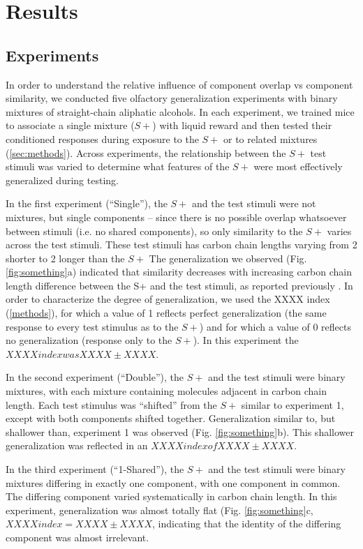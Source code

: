 \section{Results}

\subsection{Experiments}
In order to understand the relative influence of component overlap vs component similarity, we conducted five olfactory generalization experiments with binary mixtures of straight-chain aliphatic alcohols.  In each experiment, we trained mice to associate a single mixture ($S+$) with liquid reward and then tested their conditioned responses during exposure to the $S+$ or to related mixtures (\ref{sec:methods}).  Across experiments, the relationship between the $S+$ test stimuli was varied to determine what features of the $S+$ were most effectively generalized during testing.  

In the first experiment (``Single''), the $S+$ and the test stimuli were not mixtures, but single components -- since there is no possible overlap whatsoever between stimuli (i.e. no shared components), so only similarity to the $S+$ varies across the test stimuli.  These test stimuli has carbon chain lengths varying from 2 shorter to 2 longer than the $S+$  The generalization we observed (Fig. \ref{fig:something}a) indicated that similarity decreases with increasing carbon chain length difference between the S+ and the test stimuli, as reported previously \cite{18810459}\cite{24488965}.  In order to characterize the degree of generalization, we used the XXXX index (\ref{methods}), for which a value of 1 reflects perfect generalization (the same response to every test stimulus as to the $S+$) and for which a value of 0 reflects no generalization (response only to the $S+$).  In this experiment the $XXXX index was XXXX \pm XXXX$.  

In the second experiment (``Double''), the $S+$ and the test stimuli were binary mixtures, with each mixture containing molecules adjacent in carbon chain length.  Each test stimulus was ``shifted'' from the $S+$ similar to experiment 1, except with both components shifted together.  Generalization similar to, but shallower than, experiment 1 was observed (Fig. \ref{fig:something}b).  This shallower generalization was reflected in an $XXXX index of XXXX \pm XXXX$.  

In the third experiment (``1-Shared''), the $S+$ and the test stimuli were binary mixtures differing in exactly one component, with one component in common.  The differing component varied systematically in carbon chain length.  In this experiment, generalization was almost totally flat (Fig. \ref{fig:something}c, $XXXX index = XXXX \pm XXXX$, indicating that the identity of the differing component was almost irrelevant.  

